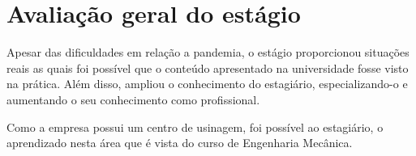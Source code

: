 \chapter{Avaliação geral do estágio}\label{ch:avaliacao}

Apesar das dificuldades em relação a pandemia, o estágio proporcionou situações reais as quais 
foi possível que o conteúdo apresentado na universidade fosse visto na prática. Além disso, ampliou 
o conhecimento do estagiário, especializando-o e aumentando o seu conhecimento como profissional.

Como a empresa possui um centro de usinagem, foi possível ao estagiário, o aprendizado nesta área que 
é vista do curso de Engenharia Mecânica. 
